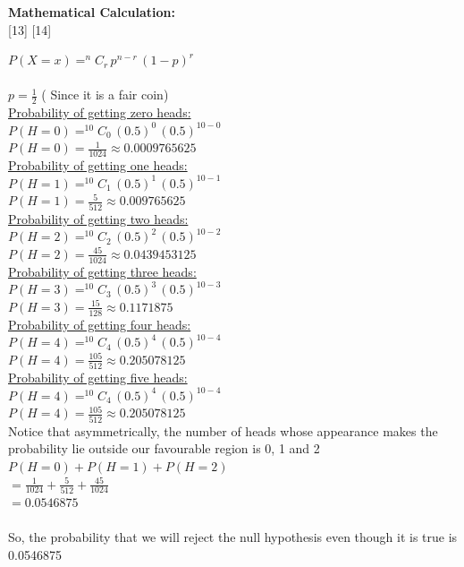 \documentclass[answers]{exam}
\begin{document}
\begin{framed}

\textbf{Mathematical Calculation:\\} [13] [14]

$P(X = x) = ^nC_r \, p^{n - r} \, (1 - p)^r$\\\\
$p = \frac{1}{2}$ ( Since it is a fair coin) \\
\underline{Probability of getting zero heads:}\\
$P(H = 0) = ^{10}C_{0} \, (0.5)^{0} \, (0.5)^{10-0}$\\
$P(H = 0) = \frac{1}{1024} \approx 0.0009765625$\\
\underline{Probability of getting one heads:}\\
$P(H = 1) = ^{10}C_{1} \, (0.5)^{1} \, (0.5)^{10-1}$\\
$P(H = 1) = \frac{5}{512} \approx 0.009765625$\\
\underline{Probability of getting two heads:}\\
$P(H = 2) = ^{10}C_{2} \, (0.5)^{2} \, (0.5)^{10-2}$\\
$P(H = 2) = \frac{45}{1024} \approx 0.0439453125$\\
\underline{Probability of getting three heads:}\\
$P(H = 3) = ^{10}C_{3} \, (0.5)^{3} \, (0.5)^{10-3}$\\
$P(H = 3) = \frac{15}{128} \approx 0.1171875  $\\
\underline{Probability of getting four heads:}\\
$P(H = 4) = ^{10}C_{4} \, (0.5)^{4} \, (0.5)^{10-4}$\\
$P(H = 4) = \frac{105}{512} \approx 0.205078125$\\
\underline{Probability of getting five heads:}\\
$P(H = 4) = ^{10}C_{4} \, (0.5)^{4} \, (0.5)^{10-4}$\\
$P(H = 4) = \frac{105}{512} \approx 0.205078125$\\
Notice that asymmetrically, the number of heads whose appearance makes the probability lie outside our favourable region is 0, 1 and 2 \\
$P(H = 0) + P(H = 1) + P(H = 2)$\\
$= \frac{1}{1024} + \frac{5}{512} + \frac{45}{1024}$\\
$= 0.0546875$\\\\
So, the probability that we will reject the null hypothesis even though it is true is 0.0546875 \\\\

\end{framed}
\end{document}
